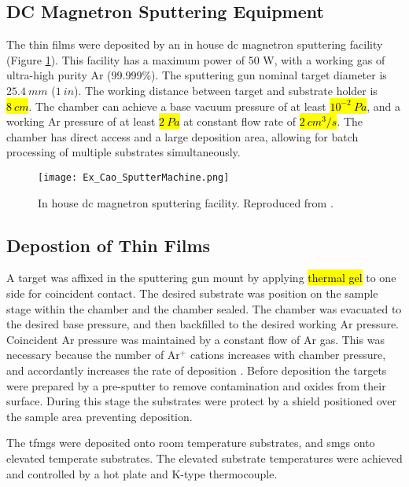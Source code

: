 \documentclass[a4paper,12pt,oneside]{report}%
\begin{document}
\subsection{DC Magnetron Sputtering Equipment}
The thin films were deposited by an in house \acrshort{dc} magnetron sputtering facility (Figure \ref{fig:CaoSputtering}). This facility has a maximum power of 50 W, with a working gas of ultra-high purity Ar (99.999\%). The sputtering gun nominal target diameter is $25.4~ mm$ ($1~ in$). The working distance between target and substrate holder is \hl{$8~ cm$}. The chamber can achieve a base vacuum pressure of at least \hl{$10^{-2}~ Pa$}, and a working Ar pressure of at least \hl{$2~ Pa$} at constant flow rate of \hl{$2~ cm^{3}/s$}. The chamber has direct access and a large deposition area, allowing for batch processing of multiple substrates simultaneously.

\begin{figure}[htbp]
	\centering
	\texttt{[image: Ex\_Cao\_SputterMachine.png]}
	\caption[In house \acrshort{dc} magnetron sputtering facility.]{In house \acrshort{dc} magnetron sputtering facility. Reproduced from \cite{Cao2013}.}
	\label{fig:CaoSputtering}
\end{figure}

\subsection{Depostion of Thin Films}
A target was affixed in the sputtering gun mount by applying \hl{thermal gel} to one side for coincident contact. The desired substrate was position on the sample stage within the chamber and the chamber sealed. The chamber was evacuated to the desired base pressure, and then backfilled to the desired working Ar pressure. Coincident Ar pressure was maintained by a constant flow of Ar gas. This was necessary because the number of Ar$^{+}$ cations increases with chamber pressure, and accordantly increases the rate of deposition \cite{Ozeki2002}. Before deposition the targets were prepared by a pre-sputter to remove contamination and oxides from their surface. During this stage the substrates were protect by a shield positioned over the sample area preventing deposition.

The \glspl{tfmg} were deposited onto room temperature substrates, and \glspl{smg} onto elevated temperate substrates. The elevated substrate temperatures were achieved and controlled by a hot plate and K-type thermocouple.
\end{document}
